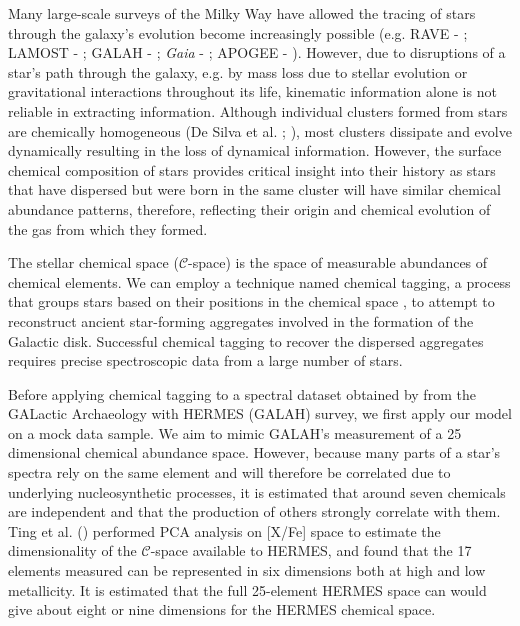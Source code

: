 \documentclass[12pt, letterpaper]{article}
\begin{document}
Many large-scale surveys of the Milky Way have allowed the tracing of stars through the galaxy's evolution become increasingly possible
(e.g. RAVE - \citeauthor{rave2006} \citeyear{rave2006}; LAMOST - \citeauthor{zhao2012lamost} \citeyear{zhao2012lamost}; GALAH - \citeauthor{desilva2015} \citeyear{desilva2015}; \emph{Gaia} - \citeauthor{refId0} \citeyear{refId0}; APOGEE - \citeauthor{majewski2017} \citeyear{majewski2017}). However, due to disruptions of a star's path through the galaxy, e.g. by mass loss due to stellar evolution or gravitational interactions throughout its life, kinematic information alone is not reliable in extracting information. Although individual clusters formed from stars are chemically homogeneous (De Silva et al. \citeyear{desilva2006,desilva2007}; \citeauthor{bovy2016} \citeyear{bovy2016}), most clusters dissipate and evolve dynamically resulting in the loss of dynamical information. However, the surface chemical composition of stars provides critical insight into their history as stars that have dispersed but were born in the same cluster will have similar chemical abundance patterns, therefore, reflecting their origin and chemical evolution of the gas from which they formed.


The stellar chemical space ($\mathcal{C}$-space) is the space of measurable abundances of chemical elements. We can employ a technique named chemical tagging, a process that groups stars based on their positions in the chemical space \citep{freeman2002}, to attempt to reconstruct ancient star-forming aggregates involved in the formation of the Galactic disk. Successful chemical tagging to recover the dispersed aggregates requires precise spectroscopic data from a large number of stars. 

Before applying chemical tagging to a spectral dataset obtained by from the GALactic Archaeology with HERMES (GALAH) survey, we first apply our model on a mock data sample. We aim to mimic GALAH's measurement of a 25 dimensional chemical abundance space. However, because many parts of a star's spectra rely on the same element and will therefore be correlated due to underlying nucleosynthetic processes, it is estimated that around seven chemicals are independent and that the production of others strongly correlate with them. Ting et al. (\citeyear{ting2012}) performed PCA analysis on [X/Fe] space to estimate the dimensionality of the $\mathcal{C}$-space available to HERMES, and found that the 17 elements measured can be represented in six dimensions both at high and low metallicity. It is estimated that the full 25-element HERMES space can would give about eight or nine dimensions for the HERMES chemical space.
\end{document}
